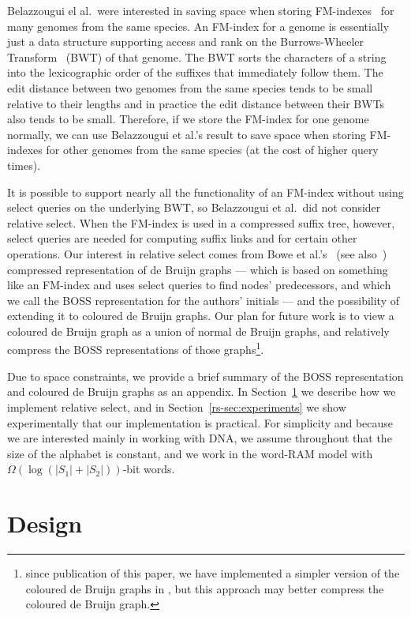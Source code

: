 Belazzougui el al.\ were interested in saving space when storing FM-indexes~\cite{FM05} for many genomes from the same species.  An FM-index for a genome is essentially just a data structure supporting access and rank on the Burrows-Wheeler Transform~\cite{BW94} (BWT) of that genome.  The BWT sorts the characters of a string into the lexicographic order of the suffixes that immediately follow them.  The edit distance between two genomes from the same species tends to be small relative to their lengths and in practice the edit distance between their BWTs also tends to be small.  Therefore, if we store the FM-index for one genome normally, we can use Belazzougui et al.'s result to save space when storing FM-indexes for other genomes from the same species (at the cost of higher query times).

It is possible to support nearly all the functionality of an FM-index without using select queries on the underlying BWT, so Belazzougui et al.\ did not consider relative select.  When the FM-index is used in a compressed suffix tree, however, select queries are needed for computing suffix links and for certain other operations.  Our interest in relative select comes from Bowe et al.'s~\cite{BOSS12} (see also~\cite{varorder-dcc}) compressed representation of de Bruijn graphs --- which is based on something like an FM-index and uses select queries to find nodes' predecessors, and which we call the BOSS representation for the authors' initials --- and the possibility of extending it to coloured de Bruijn graphs.  Our plan for future work is to view a coloured de Bruijn graph as a union of normal de Bruijn graphs, and relatively compress the BOSS representations of those graphs\footnote{since publication of this paper, we have implemented a simpler version of the coloured de Bruijn graphs in \cite{cdbg2017}, but this approach may better compress the coloured de Bruijn graph.}.

Due to space constraints, we provide a brief summary of the BOSS representation and coloured de Bruijn graphs as an appendix.  In Section~\ref{rs-sec:design} we describe how we implement relative select, and in Section~\ref{rs-sec:experiments} we show experimentally that our implementation is practical.  For simplicity and because we are interested mainly in working with DNA, we assume throughout that the size of the alphabet is constant, and we work in the word-RAM model with \(\Omega (\log (|S_1| + |S_2|))\)-bit words.

\section{Design}
\label{rs-sec:design}

